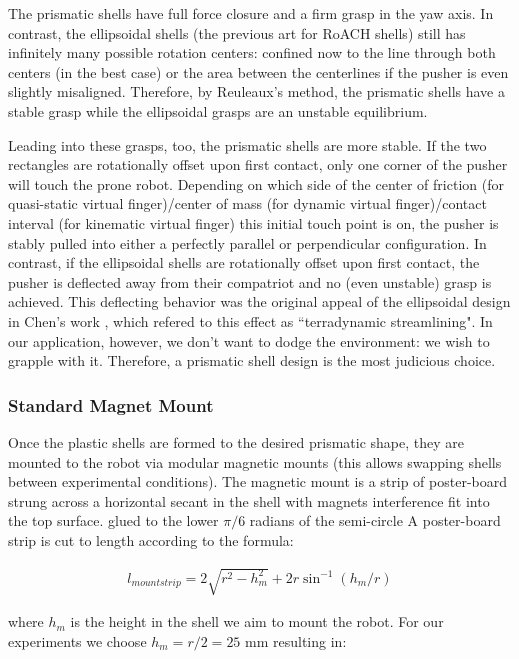 \documentclass[letterpaper, 10 pt, conference]{ieeeconf}
\begin{document}
The prismatic shells have full force closure and a firm grasp in the yaw axis.
In contrast, the ellipsoidal shells (the previous art for RoACH shells) still has infinitely many possible rotation centers: confined now to the line through both centers (in the best case) or the area between the centerlines if the pusher is even slightly misaligned.
Therefore, by Reuleaux's method, the prismatic shells have a stable grasp while the ellipsoidal grasps are an unstable equilibrium.

Leading into these grasps, too, the prismatic shells are more stable.
If the two rectangles are rotationally offset upon first contact, only one corner of the pusher will touch the prone robot.
Depending on which side of the center of friction (for quasi-static virtual finger)/center of mass (for dynamic virtual finger)/contact interval (for kinematic virtual finger) this initial touch point is on, the pusher is stably pulled into either a perfectly parallel or perpendicular configuration.
In contrast, if the ellipsoidal shells are rotationally offset upon first contact, the pusher is deflected away from their compatriot and no (even unstable) grasp is achieved.
This deflecting behavior was the original appeal of the ellipsoidal design in Chen's work \cite{ChenTerradynamic}, which refered to this effect as ``terradynamic streamlining".
In our application, however, we don't want to dodge the environment: we wish to grapple with it.
Therefore, a prismatic shell design is the most judicious choice.

\subsubsection{Standard Magnet Mount}
Once the plastic shells are formed to the desired prismatic shape, they are mounted to the robot via modular magnetic mounts (this allows swapping shells between experimental conditions).
The magnetic mount is a strip of poster-board strung across a horizontal secant in the shell with magnets interference fit into the top surface.
glued to the lower $\pi/6$ radians of the semi-circle
A poster-board strip is cut to length according to the formula:

\begin{align}
l_{mountstrip} = 2 \sqrt{r^2 - h_m^2} + 2 r \sin^{-1}(h_m/r)
\end{align}

where $h_m$ is the height in the shell we aim to mount the robot.
For our experiments we choose $h_m = r/2 = 25$ mm resulting in:
\end{document}
